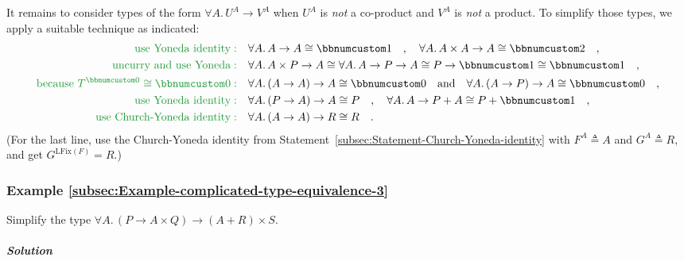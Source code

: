 It remains to consider types of the form $\forall A.\,U^{A}\rightarrow V^{A}$
when $U^{A}$ is \emph{not} a co-product and $V^{A}$ is \emph{not}
a product. To simplify those types, we apply a suitable technique
as indicated:
\begin{align*}
{\color{greenunder}\text{use Yoneda identity}:}\quad & \forall A.\,A\rightarrow A\cong\bbnum 1\quad,\quad\forall A.\,A\times A\rightarrow A\cong\bbnum 2\quad,\\
{\color{greenunder}\text{uncurry and use Yoneda}:}\quad & \forall A.\,A\times P\rightarrow A\cong\forall A.\,A\rightarrow P\rightarrow A\cong P\rightarrow\bbnum 1\cong\bbnum 1\quad,\\
{\color{greenunder}\text{because }T^{\bbnum 0}\cong\bbnum 0:}\quad & \forall A.\,(A\rightarrow A)\rightarrow A\cong\bbnum 0\quad\text{and}\quad\forall A.\,(A\rightarrow P)\rightarrow A\cong\bbnum 0\quad,\\
{\color{greenunder}\text{use Yoneda identity}:}\quad & \forall A.\,(P\rightarrow A)\rightarrow A\cong P\quad,\quad\forall A.\,A\rightarrow P+A\cong P+\bbnum 1\quad,\\
{\color{greenunder}\text{use Church-Yoneda identity}:}\quad & \forall A.\,(A\rightarrow A)\rightarrow R\cong R\quad.
\end{align*}
(For the last line, use the Church-Yoneda identity from Statement~\ref{subsec:Statement-Church-Yoneda-identity}
with $F^{A}\triangleq A$ and $G^{A}\triangleq R$, and get $G^{\text{LFix}(F)}=R$.)

\subsubsection{Example \label{subsec:Example-complicated-type-equivalence-3}\ref{subsec:Example-complicated-type-equivalence-3}}

Simplify the type $\forall A.\,(P\rightarrow A\times Q)\rightarrow(A+R)\times S$.

\subparagraph{Solution}

